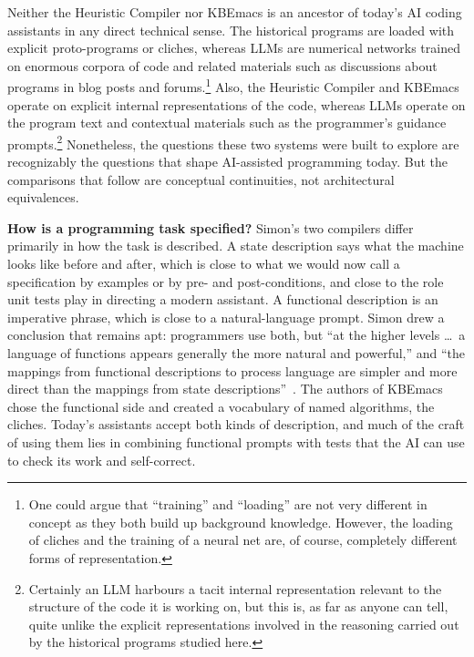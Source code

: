 \documentclass[11pt]{article}
\begin{document}
Neither the Heuristic Compiler nor KBEmacs is an ancestor of today's
AI coding assistants in any direct technical sense. The historical
programs are loaded with explicit proto-programs or cliches, whereas
LLMs are numerical networks trained on enormous corpora of code and
related materials such as discussions about programs in blog posts and
forums.\footnote{One could argue that ``training'' and ``loading'' are
not very different in concept as they both build up background
knowledge. However, the loading of cliches and the training of a
neural net are, of course, completely different forms of
representation.}  Also, the Heuristic Compiler and KBEmacs operate on
explicit internal representations of the code, whereas LLMs operate on
the program text and contextual materials such as the programmer's
guidance prompts.\footnote{Certainly an LLM harbours a tacit internal
representation relevant to the structure of the code it is working on,
but this is, as far as anyone can tell, quite unlike the explicit
representations involved in the reasoning carried out by the
historical programs studied here.} Nonetheless, the questions these
two systems were built to explore are recognizably the questions that
shape AI-assisted programming today. But the comparisons that follow
are conceptual continuities, not architectural equivalences.

\textbf{How is a programming task specified?} Simon's two compilers
differ primarily in how the task is described. A state description
says what the machine looks like before and after, which is close to
what we would now call a specification by examples or by pre- and
post-conditions, and close to the role unit tests play in directing a
modern assistant. A functional description is an imperative phrase,
which is close to a natural-language prompt. Simon drew a conclusion
that remains apt: programmers use both, but ``at the higher levels
\ldots\ a language of functions appears generally the more natural and
powerful,'' and ``the mappings from functional descriptions to process
language are simpler and more direct than the mappings from state
descriptions''~\cite[p.~506]{simon1963jacm}. The authors of KBEmacs
chose the functional side and created a vocabulary of named
algorithms, the cliches. Today's assistants accept both kinds of
description, and much of the craft of using them lies in combining
functional prompts with tests that the AI can use to check its work
and self-correct.
\end{document}
